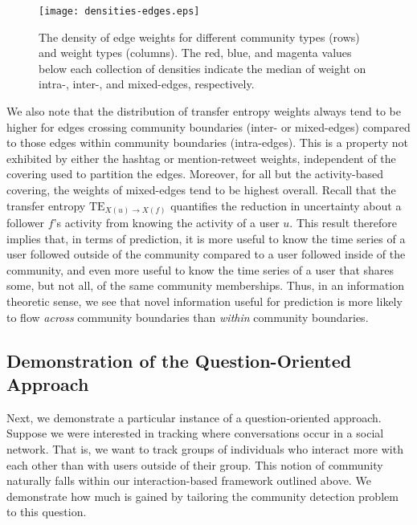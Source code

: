 
\begin{figure}[!h]
	\centering
	\texttt{[image: densities-edges.eps]}
	\caption{The density of edge weights for different community types (rows) and weight types (columns). The red,  blue, and magenta values below each collection of densities indicate the median of weight on intra-, inter-, and mixed-edges, respectively.}
	\label{Fig-distributions_by_types}
\end{figure}

We also note that the distribution of transfer entropy weights always tend to be higher for edges crossing community boundaries (inter- or mixed-edges) compared to those edges within community boundaries (intra-edges). This is a property not exhibited by either the hashtag or mention-retweet weights, independent of the covering used to partition the edges. Moreover, for all but the activity-based covering, the weights of mixed-edges tend to be highest overall.  Recall that the transfer entropy $\text{TE}_{X(u) \to X(f)}$ quantifies the reduction in uncertainty about a follower $f$'s activity from knowing the activity of a user $u$. This result therefore implies that, in terms of prediction, it is more useful to know the time series of a user followed outside of the community compared to a user followed inside of the community, and even more useful to know the time series of a user that shares some, but not all, of the same community memberships. Thus, in an information theoretic sense, we see that novel information useful for prediction is more likely to flow \emph{across} community boundaries than \emph{within} community boundaries.

\subsection{Demonstration of the Question-Oriented Approach}

Next, we demonstrate a particular instance of a question-oriented approach. Suppose we were interested in tracking where conversations occur in a social network. That is, we want to track groups of individuals who interact more with each other than with users outside of their group. This notion of community naturally falls within our interaction-based framework outlined above. We demonstrate how much is gained by tailoring the community detection problem to this question.

